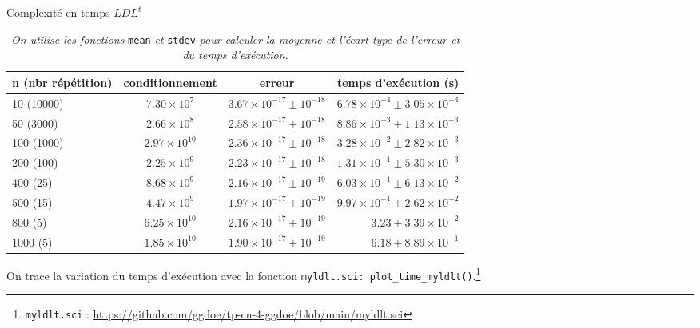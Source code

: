\documentclass{article}
\begin{document}
\begin{table}[H]
\centering
\footnotesize
\renewcommand*\arraystretch{1.3}
\caption{Complexité en temps \(LDL^t\)}
\begin{tabular}{|l|c|c|r|}
  \hline
  n (nbr répétition) & conditionnement & erreur & temps d'exécution (s)\\
  \hline
	10 (10000)	& \(7.30 \times 10^{7}  \)	& \(3.67 \times 10^{-17} \pm 10^{-18}	\)	& \(6.78 \times 10^{-4} \pm3.05 \times 10^{-4}\) \\
	50 (3000)	& \(2.66 \times 10^{8}  \)	& \(2.58 \times 10^{-17} \pm 10^{-18}	\)	& \(8.86 \times 10^{-3} \pm1.13 \times 10^{-3}\) \\
	100 (1000)	& \(2.97 \times 10^{10} \)& \(2.36 \times 10^{-17} \pm 10^{-18}	\)	& \(3.28 \times 10^{-2} \pm2.82 \times 10^{-3}\) \\
	200 (100)	& \(2.25 \times 10^{9}  \)	& \(2.23 \times 10^{-17} \pm 10^{-18}	\)	& \(1.31 \times 10^{-1} \pm5.30 \times 10^{-3}\) \\
	400 (25)	& \(8.68 \times 10^{9}  \)	& \(2.16 \times 10^{-17} \pm 10^{-19}	\)	& \(6.03 \times 10^{-1} \pm6.13 \times 10^{-2}\) \\
	500 (15)	& \(4.47 \times 10^{9}  \)	& \(1.97 \times 10^{-17} \pm 10^{-19}	\)	& \(9.97 \times 10^{-1} \pm2.62 \times 10^{-2}\) \\
	800 (5)		& \(6.25 \times 10^{10} \)	& \(2.16 \times 10^{-17} \pm 10^{-19}	\)	& \(3.23 \pm3.39 \times 10^{-2}\) \\
	1000 (5)	& \(1.85 \times 10^{10} \)	& \(1.90 \times 10^{-17} \pm 10^{-19}	\)	& \(6.18 \pm8.89 \times 10^{-1}\) \\
  \hline
\end{tabular}
\caption*{\textit{On utilise les fonctions }\texttt{mean}\textit{ et }\texttt{stdev} \textit{pour calculer la moyenne et l'écart-type de l'erreur et du temps d'exécution.}}
\end{table}

On trace la variation du temps d'exécution avec la fonction \texttt{myldlt.sci: plot\_time\_myldlt()}.\footnote{\texttt{myldlt.sci} : \href{https://github.com/ggdoe/tp-cn-4-ggdoe/blob/main/myldlt.sci}{https://github.com/ggdoe/tp-cn-4-ggdoe/blob/main/myldlt.sci}}
\end{document}
